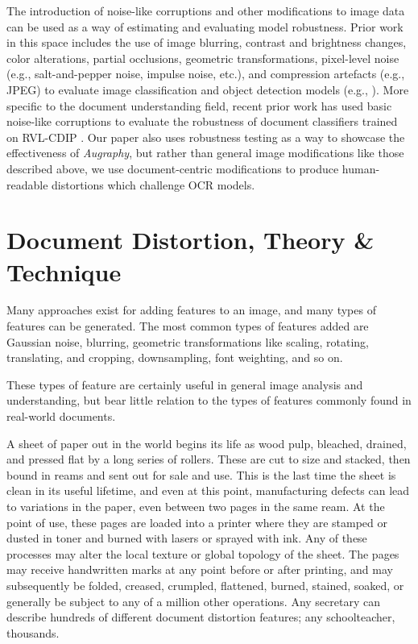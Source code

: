 \documentclass[runningheads]{llncs}
\begin{document}
The introduction of noise-like corruptions and other modifications to image data can be used as a way of estimating and evaluating model robustness.
Prior work in this space includes the use of image blurring, contrast and brightness changes, color alterations, partial occlusions, geometric transformations, pixel-level noise (e.g., salt-and-pepper noise, impulse noise, etc.), and compression artefacts (e.g., JPEG) to evaluate image classification and object detection models (e.g., \cite{image-quality-impact,imagenet-c,pathology-recommendations,Hosseini2017-kn-google-api,face-recognition-impact,pathology-schomig,Vasiljevic2016-al-bluring-impact}).
More specific to the document understanding field, recent prior work has used basic noise-like corruptions to evaluate the robustness of document classifiers trained on RVL-CDIP \cite{saifullah-2022}.
Our paper also uses robustness testing as a way to showcase the effectiveness of \emph{Augraphy}, but rather than general image modifications like those described above, we use document-centric modifications to produce human-readable distortions which challenge OCR models.

\section{Document Distortion, Theory \& Technique}
Many approaches exist for adding features to an image, and many types of features can be generated. The most common types of features added are Gaussian noise, blurring, geometric transformations like scaling, rotating, translating, and cropping, downsampling, font weighting, and so on.

These types of feature are certainly useful in general image analysis and understanding, but bear little relation to the types of features commonly found in real-world documents.

A sheet of paper out in the world begins its life as wood pulp, bleached, drained, and pressed flat by a long series of rollers. These are cut to size and stacked, then bound in reams and sent out for sale and use. This is the last time the sheet is clean in its useful lifetime, and even at this point, manufacturing defects can lead to variations in the paper, even between two pages in the same ream. At the point of use, these pages are loaded into a printer where they are stamped or dusted in toner and burned with lasers or sprayed with ink. Any of these processes may alter the local texture or global topology of the sheet. The pages may receive handwritten marks at any point before or after printing, and may subsequently be folded, creased, crumpled, flattened, burned, stained, soaked, or generally be subject to any of a million other operations. Any secretary can describe hundreds of different document distortion features; any schoolteacher, thousands.
\end{document}
